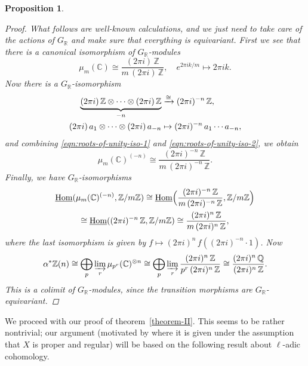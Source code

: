 \documentclass[leqno,12pt]{article}
\theoremstyle{plain}
\newtheorem{proposition}[theorem]{\indent\sc Proposition}
\theoremstyle{definition}
\DeclareMathOperator{\Hom}{Hom}
\newcommand{\CC}{\mathbb{C}}
\newcommand{\QQ}{\mathbb{Q}}
\newcommand{\RR}{\mathbb{R}}
\newcommand{\ZZ}{\mathbb{Z}}
\newcommand{\iHom}{\underline{\Hom}}
\begin{document}
\begin{proposition}
\begin{proof}
    What follows are well-known calculations, and we just need to take care of
    the actions of $G_\RR$ and make sure that everything is equivariant. First
    we see that there is a canonical isomorphism of $G_\RR$-modules
    \begin{equation}
      \label{eqn:roots-of-unity-iso-1}
      \mu_m (\CC) \cong \frac{(2\pi i) \, \ZZ}{m\,(2\pi i)\,\ZZ}, \quad
      e^{2\pi i k/m} \mapsto 2\pi i k.
    \end{equation}
    Now there is a $G_\RR$-isomorphism
    \begin{align}
      \label{eqn:roots-of-unity-iso-2}
      \underbrace{(2\pi i)\,\ZZ\otimes\cdots\otimes (2\pi i)\,\ZZ}_{-n} & \xrightarrow{\cong} (2\pi i)^{-n}\,\ZZ,\\
      \notag (2\pi i)\,a_1\otimes\cdots\otimes (2\pi i)\,a_{-n} & \mapsto (2\pi i)^{-n}\,a_1\cdots a_{-n},
    \end{align}
    and combining \eqref{eqn:roots-of-unity-iso-1}
    and \eqref{eqn:roots-of-unity-iso-2}, we obtain
    $$\mu_m (\CC)^{(-n)} \cong \frac{(2\pi i)^{-n} \, \ZZ}{m\,(2\pi i)^{-n}\,\ZZ}.$$
    Finally, we have $G_\RR$-isomorphisms
    \begin{multline*}
      \iHom (\mu_m (\CC)^{(-n)}, \ZZ/m\ZZ) \cong
      \iHom \Bigl(\frac{(2\pi i)^{-n} \, \ZZ}{m\,(2\pi i)^{-n}\,\ZZ}, \ZZ/m\ZZ\Bigr) \\
      \cong
      \iHom ((2\pi i)^{-n}\,\ZZ, \ZZ/m\ZZ) \cong
      \frac{(2\pi i)^n\,\ZZ}{m\,(2\pi i)^n\,\ZZ},
    \end{multline*}
    where the last isomorphism is given by
    $f \mapsto (2\pi i)^n \, f ((2\pi i)^{-n}\cdot 1)$.
    Now
    \[ \alpha^* \ZZ (n) \cong
    \bigoplus_p \varinjlim_r \mu_{p^r} (\CC)^{\otimes n} \cong
    \bigoplus_p \varinjlim_r \frac{(2\pi i)^n\,\ZZ}{p^r\,(2\pi i)^n\,\ZZ} \cong
    \frac{(2\pi i)^n\,\QQ}{(2\pi i)^n\,\ZZ}. \]
    This is a colimit of $G_\RR$-modules, since the transition morphisms are
    $G_\RR$-equivariant.
  \end{proof}
\end{proposition}

We proceed with our proof of theorem~\ref{theorem-II}. This seems to be rather
nontrivial; our argument (motivated by \cite{Flach-Morin-2018} where it is given
under the assumption that $X$ is proper and regular) will be based on the
following result about $\ell$-adic cohomology.
\end{document}
